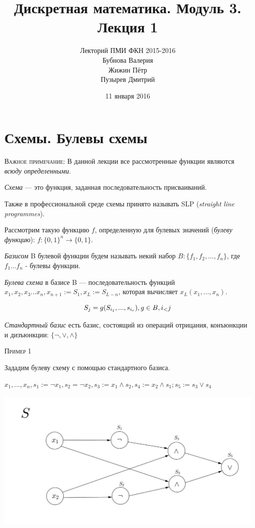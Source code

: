 ﻿\documentclass[a4paper, 12pt]{article}
\begin{document}
\title{Дискретная математика. Модуль 3. Лекция 1}
\author{Лекторий ПМИ ФКН 2015-2016\\Бубнова Валерия\\Жижин Пётр\\Пузырев Дмитрий}
\date{11 января 2016}

\maketitle
\section*{Схемы. Булевы схемы}
\textsc{Важное примечание:} В данной лекции все рассмотренные функции являются \textit{всюду определенными}.

\textit{Схема} --- это функция, заданная последовательность присваиваний.

Также в профессиональной среде схемы принято называть SLP (\textit{straight line programmes}). 

Рассмотрим такую функцию $f$, определенную для булевых значений (\textit{булеву функцию}): $f:\{0, 1\}^n \rightarrow \{0, 1\}$.

\textit{Базисом} B булевой функции будем называть некий набор $B:\{f_1, f_2, \ldots , f_n\}$, где $f_1 \ldots f_n$ - булевы функции.

\textit{Булева схема} в базисе B  --- последовательность функций $x_1, x_2, x_3... x_n, x_{n+1} := S_1, x_L := S_{L-n}$, которая вычисляет $x_L(x_1, \ldots ,x_n)$. 

\[S_j = g(S_{i_1},  ... , s_{i_r}), g \in B, i_\mathalpha < j\]

\textit{Стандартный базис} есть базис, состоящий из операций отрицания, конъюнкции и дизъюнкции: $\{\lnot, \vee, \wedge\}$

\textsc{Пример 1}

Зададим булеву схему с помощью стандартного базиса.

$x_1, \ldots ,x_n, s_1 := \lnot x_1, s_2 = \lnot x_2, s_3 := x_1 \wedge s_2, s_4 := x_2 \wedge s_1; s_5 := s_3 \vee s_4$

\includegraphics[height=7cm]{images/1.png}
 
\end{document}
